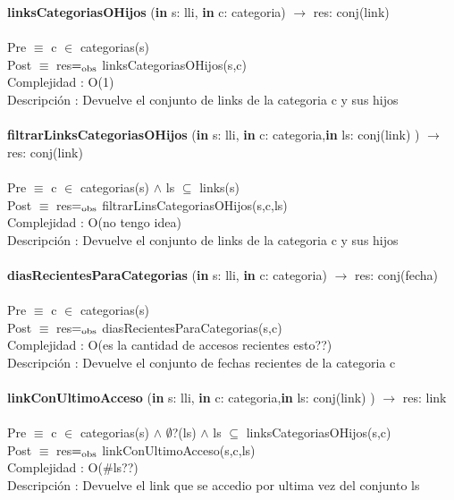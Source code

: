 \documentclass[10pt, a4paper]{article}
\begin{document}
	
	\textbf{linksCategoriasOHijos} (\textbf{in} s: lli, \textbf{in} c: categoria) $\longrightarrow$ res: conj(link)\\\\
	Pre $\equiv$ {c $\in$ categorias(s)}\\
	Post $\equiv$ {res$=_{\mathrm{obs}}$ linksCategoriasOHijos(s,c)}\\
	Complejidad : O(1)\\
	Descripci\'{o}n : Devuelve el conjunto de links de la categoria c y sus hijos\\\\
	
	
	\textbf{filtrarLinksCategoriasOHijos} (\textbf{in} s: lli, \textbf{in} c: categoria,\textbf{in} ls: conj(link) ) $\longrightarrow$ res: conj(link)\\\\
	Pre $\equiv$ {c $\in$ categorias(s) $\wedge$ ls $\subseteq$ links(s)}\\
	Post $\equiv$ {res$=_{\mathrm{obs}}$ filtrarLinsCategoriasOHijos(s,c,ls)}\\
	Complejidad : O(no tengo idea)\\
	Descripci\'{o}n : Devuelve el conjunto de links de la categoria c y sus hijos\\\\

	\textbf{diasRecientesParaCategorias} (\textbf{in} s: lli, \textbf{in} c: categoria) $\longrightarrow$ res: conj(fecha)\\\\
	Pre $\equiv$ {c $\in$ categorias(s)}\\
	Post $\equiv$ {res$=_{\mathrm{obs}}$ diasRecientesParaCategorias(s,c)}\\
	Complejidad : O(es la cantidad de accesos recientes esto??)\\
	Descripci\'{o}n : Devuelve el conjunto de fechas recientes de la categoria c\\\\
	
	\textbf{linkConUltimoAcceso} (\textbf{in} s: lli, \textbf{in} c: categoria,\textbf{in} ls: conj(link) ) $\longrightarrow$ res: link\\\\
	Pre $\equiv$ {c $\in$ categorias(s) $\wedge$ $\emptyset$?(ls) $\wedge$ ls $\subseteq$ linksCategoriasOHijos(s,c)}\\
	Post $\equiv$ {res$=_{\mathrm{obs}}$ linkConUltimoAcceso(s,c,ls)}\\
	Complejidad : O($\#$ls??)\\
	Descripci\'{o}n : Devuelve el link que se accedio por ultima vez del conjunto ls\\\\
	
\end{document}
